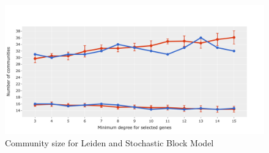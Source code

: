 \begin{figure}[!htb]   
\centering
\includegraphics[width=1.0\textwidth,height=1.0\textheight,keepaspectratio]{Sections/Network_I/Resources/selective_pruning/sbm_Leiden_combNum.png}
  \caption{Community size for Leiden and Stochastic Block Model}
\label{fig:N_I:leid_mod_sel}
\end{figure}


